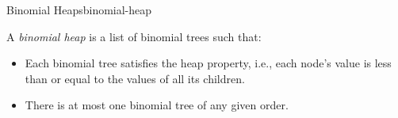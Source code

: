 \documentclass{tufte-handout}
\begin{document}
\begin{model}{Binomial Heaps}{binomial-heap}
  \begin{defn}
    A \emph{binomial heap} is a list of binomial trees such that:
    \begin{itemize}
    \item Each binomial tree satisfies the heap property, i.e., each node's value is less than or equal to the values of all its children.
    \item There is at most one binomial tree of any given order.
    \end{itemize}
  \end{defn}
  \begin{center}
    
  \end{center}
  \label{binomial-heap}
\end{model}
\end{document}
